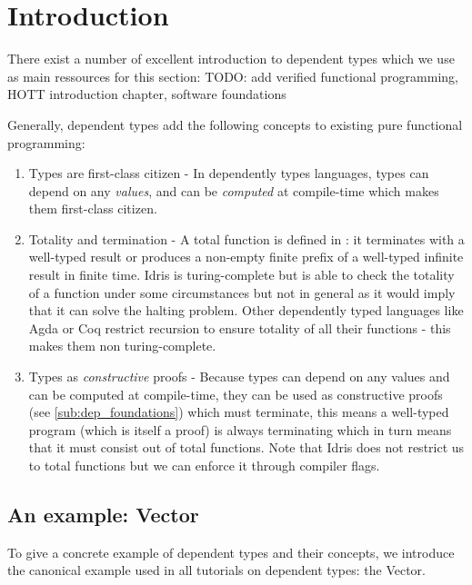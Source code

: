 \section{Introduction}
\label{sec:dep_background}

There exist a number of excellent introduction to dependent types which we use as main ressources for this section: \cite{thompson_type_1991, brady_type-driven_2017} TODO: add verified functional programming, HOTT introduction chapter, software foundations

Generally, dependent types add the following concepts to existing pure functional programming:

\begin{enumerate}
	\item Types are first-class citizen - In dependently types languages, types can depend on any \textit{values}, and can be \textit{computed} at compile-time which makes them first-class citizen.

	\item Totality and termination - A total function is defined in \cite{brady_type-driven_2017}: it terminates with a well-typed result or produces a non-empty finite prefix of a well-typed infinite result in finite time. Idris is turing-complete but is able to check the totality of a function under some circumstances but not in general as it would imply that it can solve the halting problem. Other dependently typed languages like Agda or Coq restrict recursion to ensure totality of all their functions - this makes them non turing-complete.

	\item Types as \textit{constructive} proofs - Because types can depend on any values and can be computed at compile-time, they can be used as constructive proofs (see \ref{sub:dep_foundations}) which must terminate, this means a well-typed program (which is itself a proof) is always terminating which in turn means that it must consist out of total functions. Note that Idris does not restrict us to total functions but we can enforce it through compiler flags.
\end{enumerate}

\subsection{An example: Vector}
To give a concrete example of dependent types and their concepts, we introduce the canonical example used in all tutorials on dependent types: the Vector.

